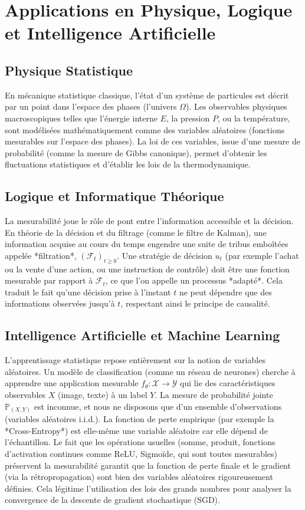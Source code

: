 \documentclass[11pt,a4paper]{article}
\begin{document}
\section{Applications en Physique, Logique et Intelligence Artificielle}

\subsection{Physique Statistique}
En mécanique statistique classique, l'état d'un système de particules est décrit par un point dans l'espace des phases (l'univers $\Omega$). Les observables physiques macroscopiques telles que l'énergie interne $E$, la pression $P$, ou la température, sont modélisées mathématiquement comme des variables aléatoires (fonctions mesurables sur l'espace des phases). La loi de ces variables, issue d'une mesure de probabilité (comme la mesure de Gibbs canonique), permet d'obtenir les fluctuations statistiques et d'établir les lois de la thermodynamique.

\subsection{Logique et Informatique Théorique}
La mesurabilité joue le rôle de pont entre l'information accessible et la décision. En théorie de la décision et du filtrage (comme le filtre de Kalman), une information acquise au cours du temps engendre une suite de tribus emboîtées appelée *filtration*, $(\mathcal{F}_t)_{t \ge 0}$. Une stratégie de décision $u_t$ (par exemple l'achat ou la vente d'une action, ou une instruction de contrôle) doit être une fonction mesurable par rapport à $\mathcal{F}_t$, ce que l'on appelle un processus *adapté*. Cela traduit le fait qu'une décision prise à l'instant $t$ ne peut dépendre que des informations observées jusqu'à $t$, respectant ainsi le principe de causalité.

\subsection{Intelligence Artificielle et Machine Learning}
L'apprentissage statistique repose entièrement sur la notion de variables aléatoires.
Un modèle de classification (comme un réseau de neurones) cherche à apprendre une application mesurable $f_\theta : \mathcal{X} \to \mathcal{Y}$ qui lie des caractéristiques observables $X$ (image, texte) à un label $Y$.
La mesure de probabilité jointe $\mathbb{P}_{(X,Y)}$ est inconnue, et nous ne disposons que d'un ensemble d'observations (variables aléatoires i.i.d.).
La fonction de perte empirique (par exemple la *Cross-Entropy*) est elle-même une variable aléatoire car elle dépend de l'échantillon. Le fait que les opérations usuelles (somme, produit, fonctions d'activation continues comme ReLU, Sigmoïde, qui sont toutes mesurables) préservent la mesurabilité garantit que la fonction de perte finale et le gradient (via la rétropropagation) sont bien des variables aléatoires rigoureusement définies. Cela légitime l'utilisation des lois des grands nombres pour analyser la convergence de la descente de gradient stochastique (SGD).
\end{document}
